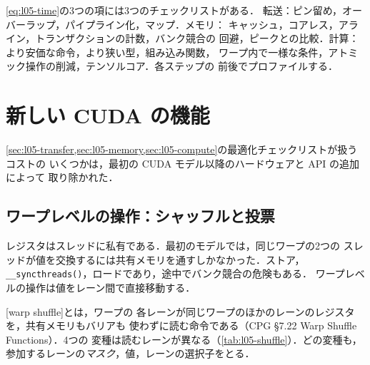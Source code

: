 \documentclass[../main.tex]{subfiles}
\begin{document}
\begin{keypoint}
  \cref{eq:l05-time}の3つの項には3つのチェックリストがある．
  転送：ピン留め，オーバーラップ，パイプライン化，マップ．メモリ：
  キャッシュ，コアレス，アライン，トランザクションの計数，バンク競合の
  回避，ピークとの比較．計算：より安価な命令，より狭い型，組み込み関数，
  ワープ内で一様な条件，アトミック操作の削減，テンソルコア．各ステップの
  前後でプロファイルする．
\end{keypoint}

\section{新しい CUDA の機能}
\label{sec:l05-features}

\cref{sec:l05-transfer,sec:l05-memory,sec:l05-compute}の最適化チェックリストが扱うコストの
いくつかは，最初の CUDA モデル以降のハードウェアと API の追加によって
取り除かれた．

\subsection{ワープレベルの操作：シャッフルと投票}

レジスタはスレッドに私有である．最初のモデルでは，同じワープの2つの
スレッドが値を交換するには共有メモリを通すしかなかった．ストア，
\texttt{\_\_syncthreads()}，ロードであり，途中でバンク競合の危険もある．
ワープレベルの操作は値をレーン間で直接移動する．

\begin{definition}[ワープシャッフル]
  [warp shuffle]とは，ワープの
  各レーンが同じワープのほかのレーンのレジスタを，共有メモリもバリアも
  使わずに読む命令である（CPG §7.22 Warp Shuffle Functions）．4つの
  変種は読むレーンが異なる（\cref{tab:l05-shuffle}）．どの変種も，
  参加するレーンの\emph{マスク}，値，レーンの選択子をとる．
\end{definition}
\end{document}
